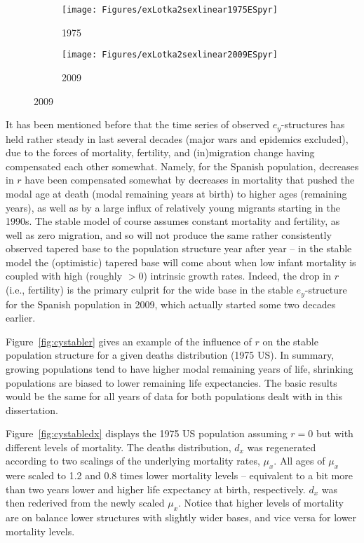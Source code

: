 \begin{figure}[!ht]
        \centering
        \caption{Spain, stable ($\sigma = 0.05$) versus initial
        $e_y$-structures, 1975 and 2009}
        \label{fig:stablevsinitES}
        \begin{subfigure}
                \centering
                \caption*{1975}
                \texttt{[image: Figures/exLotka2sexlinear1975ESpyr]}
        \end{subfigure}
        \begin{subfigure}
                \centering
                \caption*{2009}
                \texttt{[image: Figures/exLotka2sexlinear2009ESpyr]}
        \end{subfigure}
         
\end{figure}
\FloatBarrier
It has been mentioned before that the time series of observed $e_y$-structures
has held rather steady in last several decades (major wars and epidemics excluded),
due to the forces of mortality, fertility, and (in)migration change having
compensated each other somewhat. Namely, for the Spanish population, decreases
in $r$ have been compensated somewhat by decreases in mortality that pushed the modal age at
death (modal remaining years at birth) to higher ages (remaining years), as well
as by a large influx of relatively young migrants starting in the 1990s. The
stable model of course assumes constant mortality and fertility, as well as zero
migration, and so will not produce the same rather consistently observed tapered
base to the population structure year after year -- in the stable model the
(optimistic) tapered base will come about when low infant mortality is coupled
with high (roughly $>0$) intrinsic growth rates. Indeed, the drop in $r$ (i.e.,
fertility) is the primary culprit for the wide base in the stable
$e_y$-structure for the Spanish population in 2009, which actually started some
two decades earlier. 

Figure~\ref{fig:cystabler} gives an example of the
influence of $r$ on the stable population structure for a given deaths
distribution (1975 US). In summary, growing populations tend to have higher
modal remaining years of life, shrinking populations are biased to lower
remaining life expectancies. The basic results would be the same for all years
of data for both populations dealt with in this dissertation.

Figure~\ref{fig:cystabledx} displays the 1975 US population assuming $r=0$ but
with different levels of mortality. The deaths distribution, $d_x$ was
regenerated according to two scalings of the underlying mortality rates,
$\mu_x$. All ages of $\mu_x$ were scaled to 1.2 and 0.8 times lower mortality
levels -- equivalent to a bit more than two years lower and higher life
expectancy at birth, respectively. $d_x$ was then rederived from the
newly scaled $\mu_x$. Notice that higher levels of mortality are on balance
lower structures with slightly wider bases, and vice versa for lower mortality
levels. 

